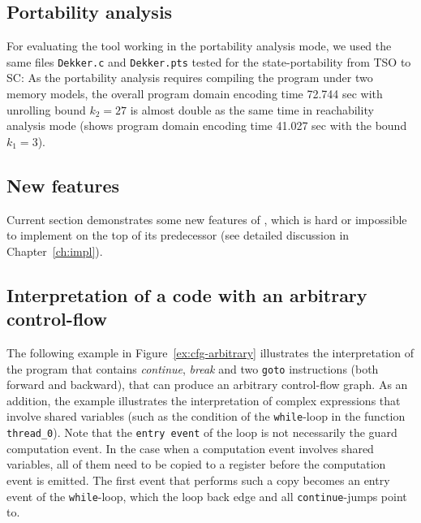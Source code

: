 \subsection{Portability analysis}
\label{ch:eval:perf:port}

For evaluating the tool working in the portability analysis mode, we used the same files \texttt{Dekker.c} and \texttt{Dekker.pts} tested for the state-portability from TSO to SC: %
As the portability analysis requires compiling the program under two memory models, the overall program domain encoding time 72.744 sec with unrolling bound $k_2=27$ is almost double as the same time in reachability analysis mode (\porthos[1] shows program domain encoding time 41.027 sec with the bound $k_1=3$).


\subsection{New features}
\label{ch:eval:perf:feat}

Current section demonstrates some new features of \porthos[2], which is hard or impossible to implement on the top of its predecessor \porthos[1] (see detailed discussion in Chapter~\ref{ch:impl}).


\subsection{Interpretation of a code with an arbitrary control-flow}

The following example in Figure~\ref{ex:cfg-arbitrary} illustrates the interpretation of the program that contains \textit{continue}, \textit{break} and two \texttt{goto} instructions (both forward and backward), that can produce an arbitrary control-flow graph.
As an addition, the example illustrates the interpretation of complex expressions that involve shared variables (such as the condition of the \texttt{while}-loop in the function \texttt{thread\_0}).
Note that the \texttt{entry event} of the loop is not necessarily the guard computation event.
In the case when a computation event involves shared variables, all of them need to be copied to a register before the computation event is emitted.
The first event that performs such a copy becomes an entry event of the \texttt{while}-loop, which the loop back edge and all \texttt{continue}-jumps point to.


